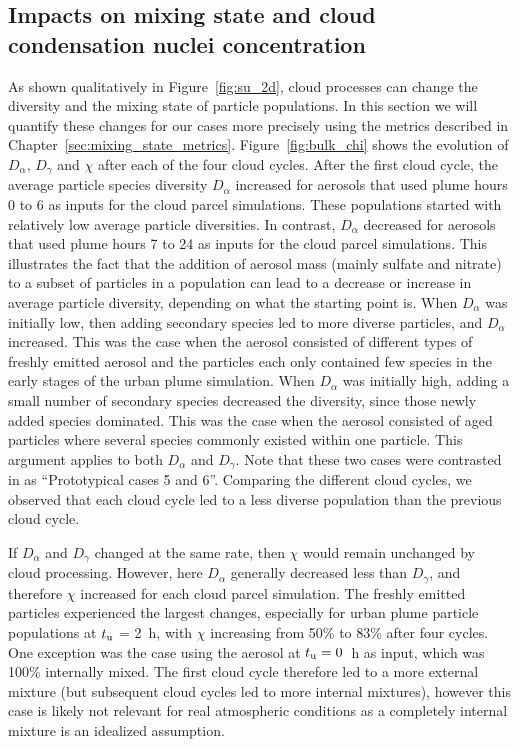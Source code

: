 \documentclass[edeposit,fullpage]{uiucthesis2009}
\begin{document}
\subsection{Impacts on mixing state and cloud condensation nuclei concentration}
As shown qualitatively in Figure~\ref{fig:su_2d}, cloud processes can
change the diversity and the mixing state of particle populations. In
this section we will quantify these changes for our cases more
precisely using the metrics described in
Chapter~\ref{sec:mixing_state_metrics}. Figure~\ref{fig:bulk_chi}
shows the evolution of $D_\alpha$, $D_\gamma$ and $\chi$ after each of
the four cloud cycles. After the first cloud cycle, the average
particle species diversity $D_\alpha$ increased for aerosols that used
plume hours 0 to 6 as inputs for the cloud parcel simulations. These
populations started with relatively low average particle
diversities. In contrast, $D_\alpha$ decreased for aerosols that used
plume hours 7 to 24 as inputs for the cloud parcel simulations. This
illustrates the fact that the addition of aerosol mass (mainly sulfate
and nitrate) to a subset of particles in a population can lead to a
decrease or increase in average particle diversity, depending on what
the starting point is. When $D_{\alpha}$ was initially low, then
adding secondary species led to more diverse particles, and
$D_{\alpha}$ increased.  This was the case when the aerosol consisted
of different types of freshly emitted aerosol and the particles each
only contained few species in the early stages of the urban plume
simulation. When $D_{\alpha}$ was initially high, adding a small
number of secondary species decreased the diversity, since those newly
added species dominated. This was the case when the aerosol consisted
of aged particles where several species commonly existed within one
particle. This argument applies to both $D_{\alpha}$ and
$D_{\gamma}$. Note that these two cases were contrasted in
\citet{Riemer2013a} as ``Prototypical cases 5 and 6''.  Comparing the
different cloud cycles, we observed that each cloud cycle led to a
less diverse population than the previous cloud cycle.

If $D_{\alpha}$ and $D_{\gamma}$ changed at the same rate, then $\chi$
would remain unchanged by cloud processing. However, here $D_{\alpha}$
generally decreased less than $D_{\gamma}$, and therefore $\chi$
increased for each cloud parcel simulation. The freshly emitted
particles experienced the largest changes, especially for urban plume
particle populations at $t_{\rm u}$ = 2~h, with $\chi$ increasing from
50\% to 83\% after four cycles. One exception was the case using the
aerosol at $t_{\rm u} = 0$~h as input, which was 100\% internally
mixed. The first cloud cycle therefore led to a more external
  mixture (but subsequent cloud cycles led to more internal mixtures),
  however this case is likely not relevant for real atmospheric
  conditions as a completely internal mixture is an idealized
  assumption.
\end{document}
